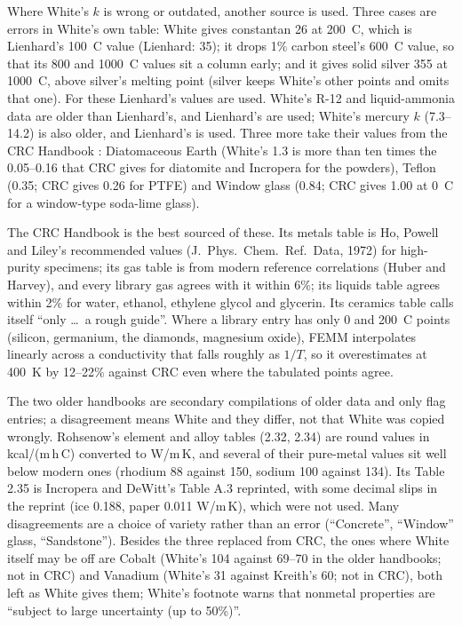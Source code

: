 \documentclass[10pt]{article}
\begin{document}
Where White's $k$ is wrong or outdated, another source is used. Three cases are errors in White's own table: White gives constantan 26 at 200~\textdegree C, which is Lienhard's 100~\textdegree C value (Lienhard: 35); it drops 1\% carbon steel's 600~\textdegree C value, so that its 800 and 1000~\textdegree C values sit a column early; and it gives solid silver 355 at 1000~\textdegree C, above silver's melting point (silver keeps White's other points and omits that one). For these Lienhard's values are used. White's R-12 and liquid-ammonia data are older than Lienhard's, and Lienhard's are used; White's mercury $k$ (7.3--14.2) is also older, and Lienhard's is used. Three more take their values from the CRC Handbook \cite{crc}: Diatomaceous Earth (White's 1.3 is more than ten times the 0.05--0.16 that CRC gives for diatomite and Incropera for the powders), Teflon (0.35; CRC gives 0.26 for PTFE) and Window glass (0.84; CRC gives 1.00 at 0~\textdegree C for a window-type soda-lime glass).

The CRC Handbook is the best sourced of these. Its metals table is Ho, Powell and Liley's recommended values (J.~Phys.\ Chem.\ Ref.\ Data, 1972) for high-purity specimens; its gas table is from modern reference correlations (Huber and Harvey), and every library gas agrees with it within 6\%; its liquids table agrees within 2\% for water, ethanol, ethylene glycol and glycerin. Its ceramics table calls itself ``only \ldots\ a rough guide''. Where a library entry has only 0 and 200~\textdegree C points (silicon, germanium, the diamonds, magnesium oxide), FEMM interpolates linearly across a conductivity that falls roughly as $1/T$, so it overestimates at 400~K by 12--22\% against CRC even where the tabulated points agree.

The two older handbooks are secondary compilations of older data and only flag entries; a disagreement means White and they differ, not that White was copied wrongly. Rohsenow's element and alloy tables (2.32, 2.34) are round values in kcal/(m\,h\,\textdegree C) converted to W/m\,K, and several of their pure-metal values sit well below modern ones (rhodium 88 against 150, sodium 100 against 134). Its Table 2.35 is Incropera and DeWitt's Table A.3 reprinted, with some decimal slips in the reprint (ice 0.188, paper 0.011 W/m\,K), which were not used. Many disagreements are a choice of variety rather than an error (``Concrete'', ``Window'' glass, ``Sandstone''). Besides the three replaced from CRC, the ones where White itself may be off are Cobalt (White's 104 against 69--70 in the older handbooks; not in CRC) and Vanadium (White's 31 against Kreith's 60; not in CRC), both left as White gives them; White's footnote warns that nonmetal properties are ``subject to large uncertainty (up to 50\%)''.
\end{document}

